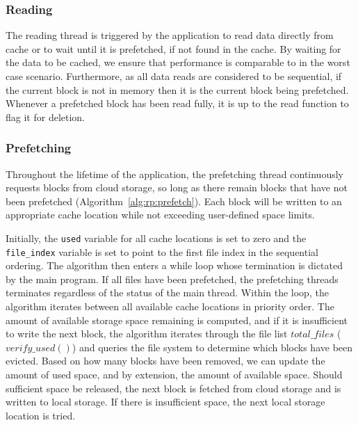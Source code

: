         
    

\subsubsection{Reading}

The reading thread is triggered by the application to read data directly from
cache or to wait until it is prefetched, if not found in the cache.
By waiting for the data to be cached, we ensure that performance is comparable
to \sfs in the worst case scenario. Furthermore, as all data reads are considered
to be sequential, if the current block is not in memory then it is the current
block being prefetched. Whenever a prefetched block has been read fully, it is
up to the read function to flag it for deletion.

\subsubsection{Prefetching}

Throughout the lifetime of the application, the prefetching thread continuously
requests blocks from cloud storage, so long as there remain blocks that have not
been prefetched (Algorithm~\ref{alg:rp:prefetch}). Each block will be written to an
appropriate cache location while not exceeding user-defined space limits.

Initially, the \texttt{used} variable for all cache locations is set to zero and
the \texttt{file\_index} variable is set to point to the first file index in the
sequential ordering. The algorithm then enters a while loop whose termination is
dictated by the main program.
If all files have been prefetched, the prefetching threads terminates regardless
of the status of the main thread. Within the loop, the algorithm iterates
between all available cache locations in priority order. The amount of available
storage space remaining is computed, and if it is insufficient to write the next
block, the algorithm iterates through the file list $total\_files$
($verify\_used()$) and queries the file system to determine which blocks have
been evicted. Based on how many blocks have been removed, we can update the
amount of used space, and by extension, the amount of available space. Should
sufficient space be released, the next block is fetched from cloud storage and
is written to local storage. If there is insufficient space, the next local
storage location is tried.

